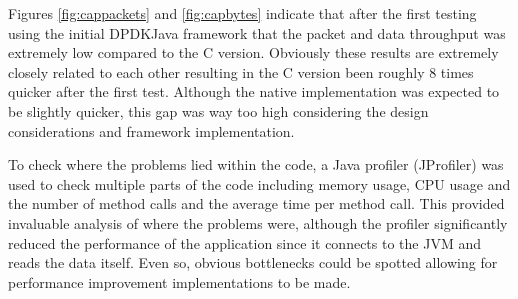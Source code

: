 \documentclass[final_report.tex]{subfiles}
\begin{document}

Figures \ref{fig:cappackets} and \ref{fig:capbytes} indicate that after the first testing using the initial DPDKJava framework that the packet and data throughput was extremely low compared to the C version. Obviously these results are extremely closely related to each other resulting in the C version been roughly 8 times quicker after the first test. Although the native implementation was expected to be slightly quicker, this gap was way too high considering the design considerations and framework implementation.

To check where the problems lied within the code, a Java profiler (JProfiler) was used to check multiple parts of the code including memory usage, CPU usage and the number of method calls and the average time per method call. This provided invaluable analysis of where the problems were, although the profiler significantly reduced the performance of the application since it connects to the JVM and reads the data itself. Even so, obvious bottlenecks could be spotted allowing for performance improvement implementations to be made.
\end{document}
